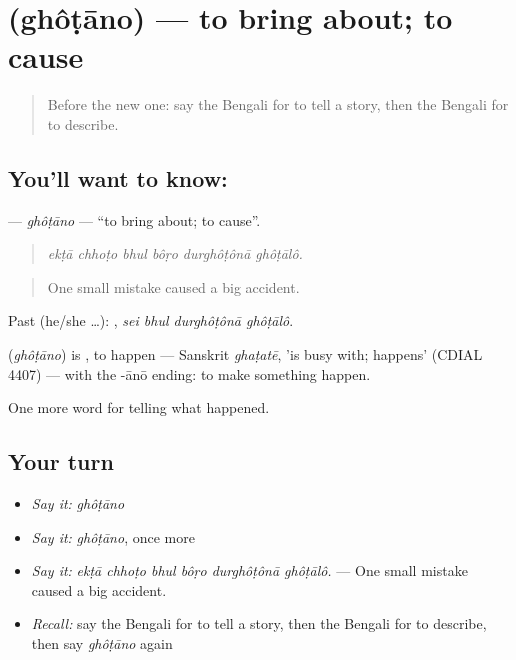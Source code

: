 \section[\texorpdfstring{\bn{ঘটানো} (ghôṭāno)}{ঘটানো (ghôṭāno)}]{ (ghôṭāno) — to bring about; to cause}

\label{lesson:BN-C302-ghotano}



\begin{quote}
Before the new one: say the Bengali for to tell a story, then the Bengali for to describe.
\end{quote}

\subsection*{You'll want to know: }
\textbf{} — \emph{ghôṭāno} — \textquotedblleft{}to bring about; to cause\textquotedblright{}.

\begin{quote}
     
\end{quote}

\begin{quote}
\emph{ekṭā chhoṭo bhul bôṛo durghôṭônā ghôṭālô.}
\end{quote}

\begin{quote}
One small mistake caused a big accident.
\end{quote}

Past (he/she …):    , \emph{sei bhul durghôṭônā ghôṭālô}.

\begin{cousinweb}
\textbf{} (\emph{ghôṭāno}) is , to happen — Sanskrit \emph{ghaṭatē}, 'is busy with; happens' (CDIAL 4407) — with the -ānō ending: to make something happen.
\end{cousinweb}

\begin{grammarlens}[title={What you've built}]
One more word for telling what happened.
\end{grammarlens}

\subsection*{Your turn}
\begin{itemize}
\raggedright
  \item \emph{Say it:} \emph{ghôṭāno}
  \item \emph{Say it:} \emph{ghôṭāno}, once more
  \item \emph{Say it:} \emph{ekṭā chhoṭo bhul bôṛo durghôṭônā ghôṭālô.} — One small mistake caused a big accident.
  \item \emph{Recall:} say the Bengali for to tell a story, then the Bengali for to describe, then say \emph{ghôṭāno} again
\end{itemize}

